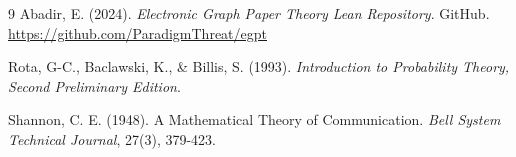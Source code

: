 \documentclass[11pt, letterpaper]{article}
\begin{document}
\begin{thebibliography}{9}
    Abadir, E. (2024). \textit{Electronic Graph Paper Theory Lean Repository}. GitHub. \url{https://github.com/ParadigmThreat/egpt}

    Rota, G-C., Baclawski, K., \& Billis, S. (1993). \textit{Introduction to Probability Theory, Second Preliminary Edition}.
    
    Shannon, C. E. (1948). A Mathematical Theory of Communication. \textit{Bell System Technical Journal}, 27(3), 379-423.

\end{thebibliography}
\end{document}
